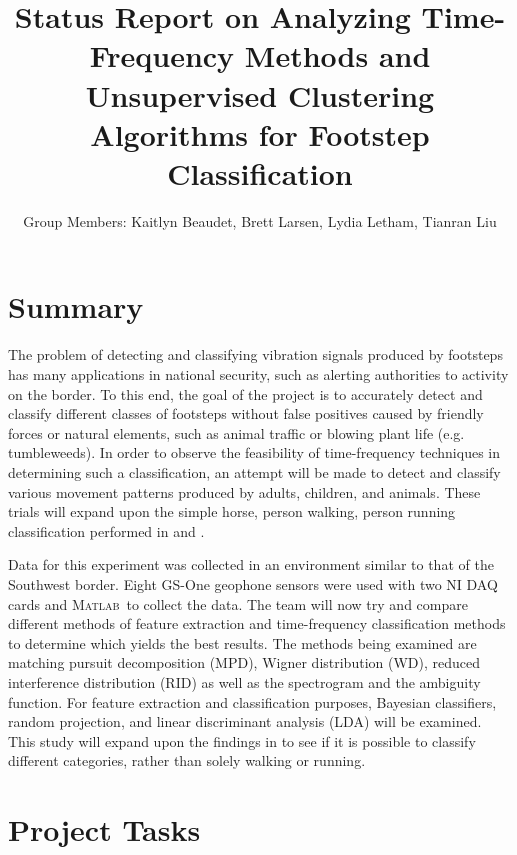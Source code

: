 \documentclass{article}[11pt]
\title{Status Report on Analyzing Time-Frequency Methods and Unsupervised Clustering Algorithms for Footstep Classification}
\author{Group Members: Kaitlyn Beaudet, Brett Larsen, Lydia Letham, Tianran Liu}
\date{}
\newcommand{\Matlab}{\textsc{Matlab}}
\begin{document}
\maketitle
\doublespace

\vspace{-30pt}

\section{Summary}
\label{sec:summary}

The problem of detecting and classifying vibration signals produced by footsteps has many applications in national security, such as alerting authorities to activity on the border. To this end, the goal of the project is to accurately detect and classify different classes of footsteps without false positives caused by friendly forces or natural elements, such as animal traffic or blowing plant life (e.g. tumbleweeds). In order to observe the feasibility of time-frequency techniques in determining such a classification, an attempt will be made to detect and classify various movement patterns produced by adults, children, and animals.  These trials will expand upon the simple horse, person walking, person running classification performed in \cite{Damarla2011} and \cite{Mehmood2012}.

Data for this experiment was collected in an environment similar to that of the Southwest border. Eight GS-One geophone sensors were used with two NI DAQ cards and \Matlab \ to collect the data. The team will now try and compare different methods of feature extraction and time-frequency classification methods to determine which yields the best results. The methods being examined are matching pursuit decomposition (MPD), Wigner distribution (WD), reduced interference distribution (RID) as well as the spectrogram and the ambiguity function. For feature extraction and classification purposes, Bayesian classifiers, random projection, and linear discriminant analysis (LDA) will be examined.  This study will expand upon the findings in \cite{Larsen2013} to see if it is possible to classify different categories, rather than solely walking or running.

\vspace{-10pt}
\section{Project Tasks}
\label{sec:tasks}
\end{document}
